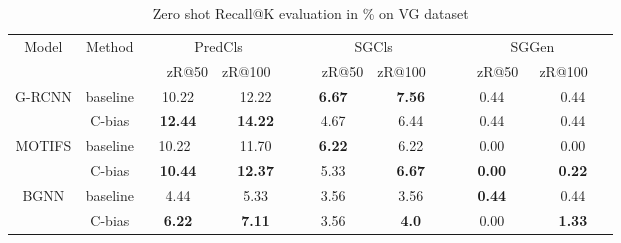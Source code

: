 \documentclass[runningheads]{llncs}
\begin{document}
\begin{table}[!t]

  \centering
  \caption{Zero shot Recall@K evaluation in \% on VG dataset}
  \label{tab:eval2}
  \begin{tabular}{cccccccc}
    \hline
    \multirow{2}{*}{Model}        & \multirow{2}{*}{Method}       & \multicolumn{2}{c}{PredCls}
                                  & \multicolumn{2}{c}{SGCls }    &
    \multicolumn{2}{c}{SGGen }                                                                            \\
                                  &                               & ~ ~zR@50                      &
    \multicolumn{1}{l}{zR@100~ ~} & ~ ~zR@50                      & \multicolumn{1}{l}{zR@100~ ~} &
    ~ ~zR@50~                     & \multicolumn{1}{l}{zR@100~ ~}                                         \\
    \hline
    \multirow{2}{*}{G-RCNN}       & baseline                      & 10.22                         & 12.22
                                  & \textbf{6.67}                 & \textbf{7.56}                 & 0.44
                                  & 0.44                                                                  \\
                                  & C-bias                        & \textbf{12.44}                &
    \textbf{14.22}                & 4.67                          & 6.44                          &
    0.44                          & 0.44                                                                  \\
    \hline
    \multirow{2}{*}{MOTIFS}       & baseline                      & 10.22~                        & 11.70
                                  & \textbf{6.22}                 & 6.22                          & 0.00
                                  & 0.00                                                                  \\
                                  & C-bias                        & \textbf{10.44}                &
    \textbf{12.37}                & 5.33                          & \textbf{6.67}                 &
    \textbf{0.00}                 & \textbf{0.22}                                                         \\
    \hline
    \multirow{2}{*}{BGNN}         & baseline                      & 4.44                          & 5.33
                                  & 3.56                          & 3.56                          &
    \textbf{0.44}                 & 0.44                                                                  \\
                                  & C-bias                        & \textbf{6.22}                 &
    \textbf{7.11}                 & 3.56                          & \textbf{4.0}                  &
    0.00                          & \textbf{1.33}                                                         \\
    \hline
  \end{tabular}
\end{table}
\end{document}
